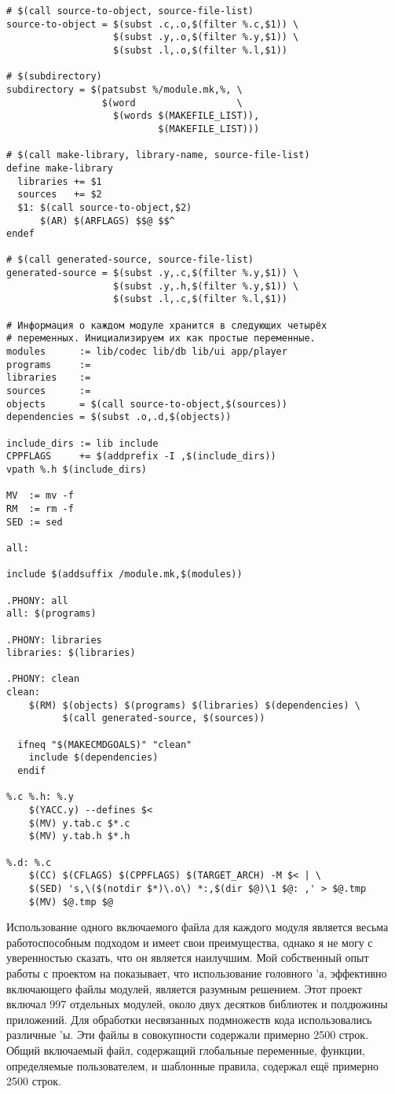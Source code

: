 {\footnotesize
\begin{verbatim}
# $(call source-to-object, source-file-list)
source-to-object = $(subst .c,.o,$(filter %.c,$1)) \
                   $(subst .y,.o,$(filter %.y,$1)) \
                   $(subst .l,.o,$(filter %.l,$1))

# $(subdirectory)
subdirectory = $(patsubst %/module.mk,%, \
                 $(word                  \
                   $(words $(MAKEFILE_LIST)),
				           $(MAKEFILE_LIST)))

# $(call make-library, library-name, source-file-list)
define make-library
  libraries += $1
  sources   += $2
  $1: $(call source-to-object,$2)
      $(AR) $(ARFLAGS) $$@ $$^
endef

# $(call generated-source, source-file-list)
generated-source = $(subst .y,.c,$(filter %.y,$1)) \
                   $(subst .y,.h,$(filter %.y,$1)) \
                   $(subst .l,.c,$(filter %.l,$1)) 

# Информация о каждом модуле хранится в следующих четырёх
# переменных. Инициализируем их как простые переменные.
modules      := lib/codec lib/db lib/ui app/player
programs     :=
libraries    :=
sources      :=
objects      = $(call source-to-object,$(sources))
dependencies = $(subst .o,.d,$(objects))

include_dirs := lib include
CPPFLAGS     += $(addprefix -I ,$(include_dirs))
vpath %.h $(include_dirs)

MV  := mv -f
RM  := rm -f
SED := sed

all:

include $(addsuffix /module.mk,$(modules))

.PHONY: all
all: $(programs)

.PHONY: libraries
libraries: $(libraries)

.PHONY: clean
clean:
    $(RM) $(objects) $(programs) $(libraries) $(dependencies) \
          $(call generated-source, $(sources))

  ifneq "$(MAKECMDGOALS)" "clean"
    include $(dependencies)
  endif

%.c %.h: %.y
    $(YACC.y) --defines $<
    $(MV) y.tab.c $*.c
    $(MV) y.tab.h $*.h

%.d: %.c
    $(CC) $(CFLAGS) $(CPPFLAGS) $(TARGET_ARCH) -M $< | \
    $(SED) 's,\($(notdir $*)\.o\) *:,$(dir $@)\1 $@: ,' > $@.tmp
    $(MV) $@.tmp $@
\end{verbatim}
}

Использование одного включаемого файла для каждого модуля является
весьма работоспособным подходом и имеет свои преимущества, однако я не
могу с уверенностью сказать, что он является наилучшим. Мой
собственный опыт работы с проектом на \Java{} показывает, что
использование головного \Makefile{}'а, эффективно включающего файлы
модулей, является разумным решением. Этот проект включал 997 отдельных
модулей, около двух десятков библиотек и полдюжины приложений.
Для обработки несвязанных подмножеств кода использовались различные
\Makefile{}'ы. Эти файлы в совокупности содержали примерно 2500 строк.
Общий включаемый файл, содержащий глобальные переменные, функции,
определяемые пользователем, и шаблонные правила, содержал ещё примерно
2500 строк.

